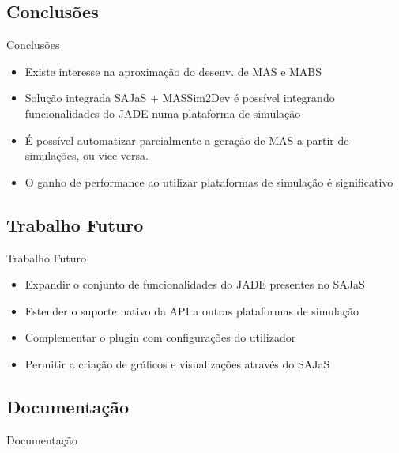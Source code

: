 
\subsection{Conclusões}
\begin{frame}{Conclusões}
	\begin{itemize}
		\item Existe interesse na aproximação do desenv. de MAS e MABS
		\item Solução integrada SAJaS + MASSim2Dev é possível integrando funcionalidades do JADE numa plataforma de simulação
		\item É possível automatizar parcialmente a geração de MAS a partir de simulações, ou vice versa.
		\item O ganho de performance ao utilizar plataformas de simulação é significativo
	\end{itemize}
\end{frame}

\subsection{Trabalho Futuro}
\begin{frame}{Trabalho Futuro}
	\begin{itemize}
		\item Expandir o conjunto de funcionalidades do JADE presentes no SAJaS
		\item Estender o suporte nativo da API a outras plataformas de simulação
		\item Complementar o plugin com configurações do utilizador
		\item Permitir a criação de gráficos e visualizações através do SAJaS
	\end{itemize}
\end{frame}

\subsection{Documentação}
\begin{frame}{Documentação}

\end{frame}

